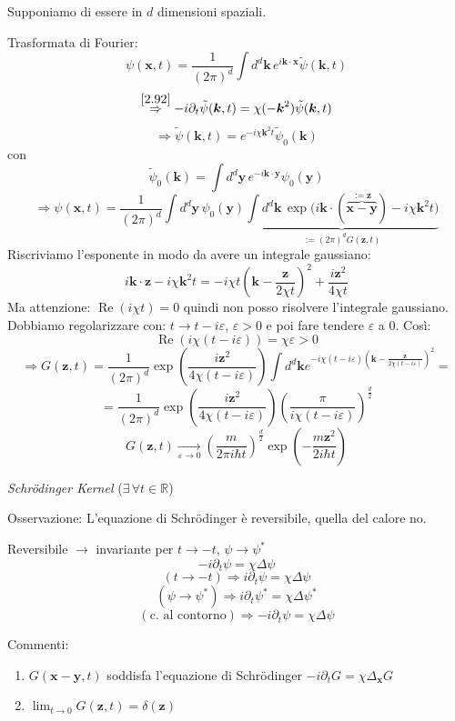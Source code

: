 \documentclass[a4paper,11pt]{report}
\newcommand{\vect}[1]{\boldsymbol{#1}}
\newcommand{\R}{\mathbb{R}}
\newcommand{\x}{\boldsymbol{x}}
\newcommand{\y}{\boldsymbol{y}}
\newcommand{\kk}{\boldsymbol{k}}
\newcommand{\z}{\boldsymbol{z}}
\begin{document}
Supponiamo di essere in $d$ dimensioni spaziali. 

Trasformata di Fourier:
\[
\psi(\x,t)=\frac{1}{(2\pi)^d}\int d^d\kk\, e^{i\kk\cdot \x}\tilde{\psi}(\kk,t)
\]
\[
\overset{\eqref{2.92}}{\Rightarrow} -i\partial_t \tilde{\psi}(\kk,t)=\chi (-\kk ^2)\tilde{\psi}(\kk,t)
\]
\[
\Rightarrow \tilde{\psi}(\kk,t) = e^{-i\chi\kk^2 t}\tilde{\psi}_0(\kk)
\]
con
\[
\tilde{\psi}_0(\kk)=\int d^d \y\, e^{-i\kk\cdot \y} \psi_0(\y)
\]
\[
\Rightarrow \psi(\x,t) = \frac{1}{(2\pi)^d}\int d^d \y\, \psi_0(\y) \underbrace{\int d^d\kk\, \exp\Big({i\kk \cdot (\overbrace{\x-\y}^{:=\vect{z}}) - i\chi \kk^2 t}\Big)}_{:=(2\pi)^d G(\z,t)}
\]
Riscriviamo l'esponente in modo da avere un integrale gaussiano:
\[
i\kk \cdot \z - i \chi \kk^2 t = -i\chi t\left(\kk - \frac{\z}{2\chi t}\right)^2 + \frac{i\z^2}{4\chi t}
\]
Ma attenzione: $\operatorname{Re}(i\chi t)=0$ quindi non posso risolvere l'integrale gaussiano. Dobbiamo regolarizzare con: $t\rightarrow t-i\varepsilon$, $\varepsilon>0$ e poi fare tendere $\varepsilon$ a 0. Cos\`i:
\[
\operatorname{Re}(i\chi(t-i\varepsilon))=\chi\varepsilon >0
\]
\[
\Rightarrow G(\z,t)=\frac{1}{(2\pi)^d}\exp \left(\frac{i\z^2}{4\chi(t-i\varepsilon)}\right) \int d^d\kk e^{-i\chi(t-i\varepsilon)\left( \kk -\frac{\z}{2\chi(t-i\varepsilon)}\right)^2}=
\]
\[
=\frac{1}{(2\pi)^d}\exp\left(\frac{i\z^2}{4\chi(t-i\varepsilon)}\right) \left( \frac{\pi}{i\chi(t-i\varepsilon)} \right)^\frac{d}{2}
\]
\begin{equation}
G(\z,t)\underset{\varepsilon \to 0}{\rightarrow} \left(\frac{m}{2\pi i \hbar t}\right)^{\frac{d}{2}}\exp \left(-\frac{m\z^2}{2i\hbar t}  \right)
\label{2.93}
\end{equation}
\centerline{\emph{Schr\"odinger Kernel} ($\exists\, \forall t\in \R$)}

\smallskip

Osservazione: L'equazione di Schr\"odinger \`e reversibile, quella del calore no.

Reversibile $\rightarrow$ invariante per $t \to -t$, $\psi \to \psi^*$
\[
-i\partial_t \psi =\chi \Delta \psi
\]
\[
(t\to -t)\Rightarrow i\partial_t\psi=\chi\Delta \psi
\]
\[
(\psi \to \psi^*)\Rightarrow i\partial_t\psi^*=\chi\Delta \psi^*
\]
\[
(\text{c. al contorno})\Rightarrow -i\partial_t\psi=\chi\Delta\psi
\]

Commenti:
\begin{enumerate}[label=(\roman*)]
\item $G(\x-\y,t)$ soddisfa l'equazione di Schr\"odinger $-i\partial_t G = \chi \Delta_{\x}G$
\item $\lim_{t\to 0} G(\z,t)=\delta(\z)$
\end{enumerate}
\end{document}
